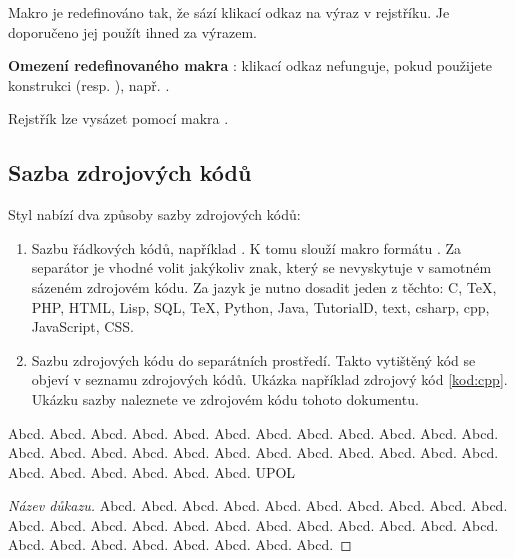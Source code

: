 \documentclass[
  field=inf,
  biblatex,
  glossaries,
  index
]{kidiplom}
\begin{document}
Makro  je redefinováno tak, že sází klikací odkaz na výraz v rejstříku. Je doporučeno jej použít ihned za výrazem.

\textbf{Omezení redefinovaného makra }: klikací odkaz nefunguje, pokud použijete konstrukci  (resp. ), např. .

Rejstřík lze vysázet pomocí makra .

\subsection{Sazba zdrojových kódů}
Styl nabízí dva způsoby sazby zdrojových kódů:

\begin{enumerate}
\item Sazbu řádkových kódů, například . K tomu slouží makro formátu . Za separátor je vhodné volit jakýkoliv znak, který se nevyskytuje v samotném sázeném zdrojovém kódu. Za jazyk je nutno dosadit jeden z těchto: C, TeX, PHP, HTML, Lisp, SQL, TeX, Python, Java, TutorialD, text, csharp, cpp, JavaScript, CSS.

\item Sazbu zdrojových kódu do separátních prostředí. Takto vytištěný kód se objeví v seznamu zdrojových kódů. Ukázka například zdrojový kód \ref{kod:cpp}. Ukázku sazby naleznete ve zdrojovém kódu tohoto dokumentu.
\end{enumerate}


\begin{definition}
Abcd. Abcd. Abcd. Abcd. Abcd. Abcd. Abcd. Abcd. Abcd. Abcd. Abcd. Abcd. Abcd. Abcd. Abcd. Abcd. Abcd. Abcd. Abcd. Abcd. Abcd. Abcd. Abcd. Abcd. Abcd. Abcd. Abcd. Abcd. Abcd. Abcd. \gls{UPOL}
\end{definition}

\begin{proof}[Název důkazu]
Abcd. Abcd. Abcd. Abcd. Abcd. Abcd. Abcd. Abcd. Abcd. Abcd. Abcd. Abcd. Abcd. Abcd. Abcd. Abcd. Abcd. Abcd. Abcd. Abcd. Abcd. Abcd. Abcd. Abcd. Abcd. Abcd. Abcd. Abcd. Abcd. Abcd. 
\end{proof}
\end{document}

